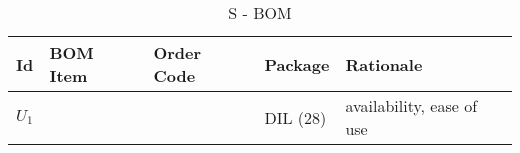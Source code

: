 \begin{table}[H]
    \centering
    \begin{tabularx}{\linewidth}{>{\hsize=0.25\hsize}X
            >{\hsize=1\hsize}X >{\hsize=1\hsize}X
            >{\hsize=0.5\hsize}X >{\hsize=2.25\hsize}X}
        Id    & BOM Item                     & Order Code & Package  & Rationale                 \\
        \midrule
        $U_1$ & \cite{noauthor_arduino_2020} &            & DIL (28) & availability, ease of use \\
    \end{tabularx}
    \caption{\mu S - BOM}
\end{table}